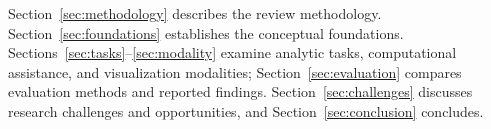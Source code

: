 Section~\ref{sec:methodology} describes the review methodology. Section~\ref{sec:foundations} establishes the conceptual foundations. Sections~\ref{sec:tasks}--\ref{sec:modality} examine analytic tasks, computational assistance, and visualization modalities; Section~\ref{sec:evaluation} compares evaluation methods and reported findings. Section~\ref{sec:challenges} discusses research challenges and opportunities, and Section~\ref{sec:conclusion} concludes.
